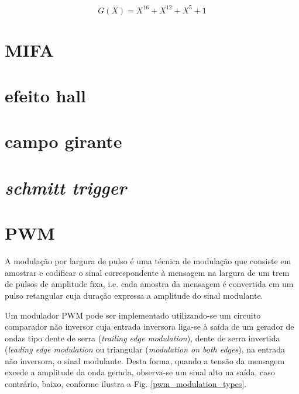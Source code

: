 \begin{equation}
\label{CRC_2}
G(X) = X^{16} + X^{12} + X^5 + 1 
\end{equation}

\section{MIFA} %

\section{efeito hall} %

\section{campo girante}

\section{\textit{schmitt trigger}}

\section{PWM}
A modulação por largura de pulso é uma técnica de modulação que consiste em amostrar e codificar o sinal correspondente à mensagem na largura de um 
trem de pulsos de amplitude fixa, i.e. cada amostra da mensagem é convertida em um pulso retangular cuja duração expressa a amplitude do sinal 
modulante.

Um modulador PWM pode ser implementado utilizando-se um circuito comparador não inversor cuja entrada inversora liga-se à saída de um gerador de 
ondas tipo dente de serra (\textit{trailing edge modulation}), dente de serra invertida (\textit{leading edge modulation}  ou triangular 
(\textit{modulation on both edges}), na entrada não inversora, o sinal modulante. 
Desta forma, quando a tensão da mensagem excede a amplitude da onda gerada, observa-se um sinal alto na saída, caso contrário, baixo, conforme 
ilustra a Fig. \ref{pwm_modulation_types}.

